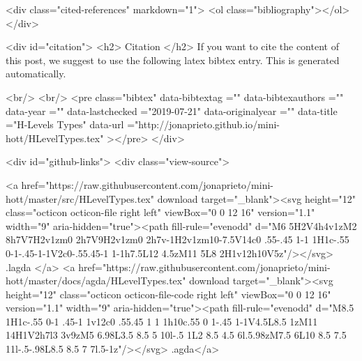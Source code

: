   <div class="cited-references" markdown="1">
  <ol class="bibliography"></ol>
  </div>


  
  <div id="citation">
  <h2> Citation </h2>
  If you want to cite the content of this post,
  we suggest to use the following latex bibtex entry.
  This is generated automatically.

  <br/>
  <br/>
  <pre class="bibtex"
       data-bibtextag =""
       data-bibtexauthors =""
       data-year =""
       data-lastchecked ="2019-07-21"
       data-originalyear =""
       data-title ="H-Levels Types"
       data-url ="http://jonaprieto.github.io/mini-hott/HLevelTypes.tex"
  ></pre>
  </div>
  

  <div id="github-links">
    <div class="view-source">
      
        <a href="https://raw.githubusercontent.com/jonaprieto/mini-hott/master/src/HLevelTypes.tex" download target="_blank"><svg height="12" class="octicon octicon-file right left" viewBox="0 0 12 16" version="1.1" width="9" aria-hidden="true"><path fill-rule="evenodd" d="M6 5H2V4h4v1zM2 8h7V7H2v1zm0 2h7V9H2v1zm0 2h7v-1H2v1zm10-7.5V14c0 .55-.45 1-1 1H1c-.55 0-1-.45-1-1V2c0-.55.45-1 1-1h7.5L12 4.5zM11 5L8 2H1v12h10V5z"/></svg> .lagda </a>
        <a href="https://raw.githubusercontent.com/jonaprieto/mini-hott/master/docs/agda/HLevelTypes.tex" download target="_blank"><svg height="12" class="octicon octicon-file-code right left" viewBox="0 0 12 16" version="1.1" width="9" aria-hidden="true"><path fill-rule="evenodd" d="M8.5 1H1c-.55 0-1 .45-1 1v12c0 .55.45 1 1 1h10c.55 0 1-.45 1-1V4.5L8.5 1zM11 14H1V2h7l3 3v9zM5 6.98L3.5 8.5 5 10l-.5 1L2 8.5 4.5 6l.5.98zM7.5 6L10 8.5 7.5 11l-.5-.98L8.5 8.5 7 7l.5-1z"/></svg> .agda</a>
      
